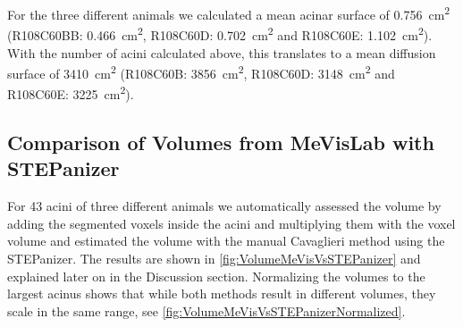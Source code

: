 \documentclass[twoside,paper=a4,abstract=true,english,DIVcalc]{scrartcl}
\newcommand{\numberofacini}{43}
\begin{document}
For the three different animals we calculated a mean acinar surface of \SI{0.756}{\centi\metre\squared} (R108C60BB: \SI{0.466}{\centi\metre\squared}, R108C60D: \SI{0.702}{\centi\metre\squared} and R108C60E: \SI{1.102}{\centi\metre\squared}). With the number of acini calculated above, this translates to a mean diffusion surface of \SI{3410}{\centi\metre\squared} (R108C60B: \SI{3856}{\centi\metre\squared}, R108C60D: \SI{3148}{\centi\metre\squared} and R108C60E: \SI{3225}{\centi\metre\squared}).

\subsection{Comparison of Volumes from MeVisLab with STEPanizer}
For \numberofacini\xspace acini of three different animals we automatically assessed the volume by adding the segmented voxels inside the acini and multiplying them with the voxel volume and estimated the volume with the manual Cavaglieri method \cite{Hsia2010} using the STEPanizer. The results are shown in \autoref{fig:VolumeMeVisVsSTEPanizer} and explained later on in the Discussion section. Normalizing the volumes to the largest acinus shows that while both methods result in different volumes, they scale in the same range, see \autoref{fig:VolumeMeVisVsSTEPanizerNormalized}.
\end{document}
